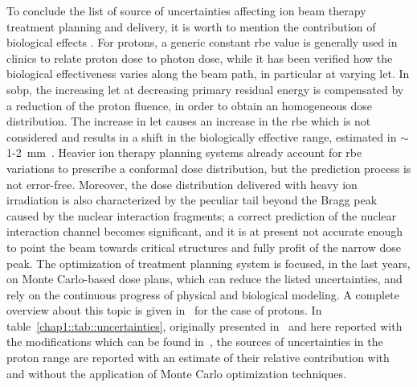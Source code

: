 To conclude the list of source of uncertainties affecting ion beam therapy treatment planning and delivery, it is worth to mention the contribution of biological effects . For protons, a generic constant \gls{rbe} value is generally used in clinics to relate proton dose to photon dose, while it has been verified how the biological effectiveness varies along the beam path, in particular at varying \gls{let}. In \gls{sobp}, the increasing \gls{let} at decreasing primary residual energy is compensated by a reduction of the proton fluence, in order to obtain an homogeneous dose distribution. The increase in \gls{let} causes an increase in the \gls{rbe} which is not considered and results in a shift in the biologically effective range, estimated in $\sim$1-2~mm~\parencite{Paganetti2000, Robertson1975, Wouters1996}. Heavier ion therapy planning systems already account for \gls{rbe} variations to prescribe a conformal dose distribution, but the prediction process is not error-free. Moreover, the dose distribution delivered with heavy ion irradiation is also characterized by the peculiar tail beyond the Bragg peak caused by the nuclear interaction fragments; a correct prediction of the nuclear interaction channel becomes significant, and it is at present not accurate enough to point the beam towards critical structures and fully profit of the narrow dose peak.
The optimization of treatment planning system is focused, in the last years, on Monte Carlo-based dose plans, which can reduce the listed uncertainties, and rely on the continuous progress of physical and biological modeling. A complete overview about this topic is given in~\cite{Paganetti2012} for the case of protons. In table~\ref{chap1::tab::uncertainties}, originally presented in~\cite{Paganetti2012} and here reported with the modifications which can be found in~\cite{Durante2016}, the sources of uncertainties in the proton range are reported with an estimate of their relative contribution with and without the application of Monte Carlo optimization techniques.

